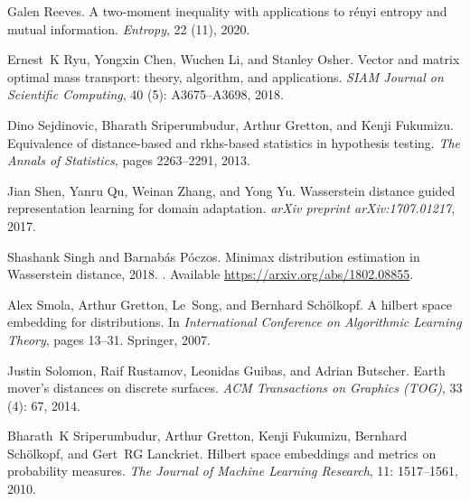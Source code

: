 \documentclass{article}
\theoremstyle{definition}
\begin{document}
\begin{thebibliography}{53}
Galen Reeves.
\newblock A two-moment inequality with applications to r\'{e}nyi entropy and
  mutual information.
\newblock \emph{Entropy}, 22 (11), 2020.

Ernest~K Ryu, Yongxin Chen, Wuchen Li, and Stanley Osher.
\newblock Vector and matrix optimal mass transport: theory, algorithm, and
  applications.
\newblock \emph{SIAM Journal on Scientific Computing}, 40
  (5): A3675--A3698, 2018.

Dino Sejdinovic, Bharath Sriperumbudur, Arthur Gretton, and Kenji Fukumizu.
\newblock Equivalence of distance-based and rkhs-based statistics in hypothesis
  testing.
\newblock \emph{The Annals of Statistics}, pages 2263--2291, 2013.

Jian Shen, Yanru Qu, Weinan Zhang, and Yong Yu.
\newblock Wasserstein distance guided representation learning for domain
  adaptation.
\newblock \emph{arXiv preprint arXiv:1707.01217}, 2017.

Shashank Singh and Barnab\'as P\'oczos.
\newblock Minimax distribution estimation in {W}asserstein distance, 2018.
\newblock [Online]. {A}vailable \url{https://arxiv.org/abs/1802.08855}.

Alex Smola, Arthur Gretton, Le~Song, and Bernhard Sch{\"o}lkopf.
\newblock A hilbert space embedding for distributions.
\newblock In \emph{International Conference on Algorithmic Learning Theory},
  pages 13--31. Springer, 2007.

Justin Solomon, Raif Rustamov, Leonidas Guibas, and Adrian Butscher.
\newblock Earth mover's distances on discrete surfaces.
\newblock \emph{ACM Transactions on Graphics (TOG)}, 33 (4):
  67, 2014.

Bharath~K Sriperumbudur, Arthur Gretton, Kenji Fukumizu, Bernhard
  Sch{\"o}lkopf, and Gert~RG Lanckriet.
\newblock Hilbert space embeddings and metrics on probability measures.
\newblock \emph{The Journal of Machine Learning Research}, 11:
  1517--1561, 2010.


\end{thebibliography}
\end{document}
